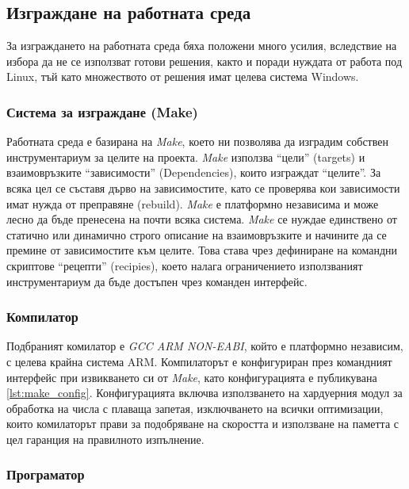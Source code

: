 \subsection{Изграждане на работната среда}

За изграждането на работната среда бяха положени много усилия, вследствие на избора да не се използват готови решения,
както и поради нуждата от работа под Linux, тъй като множеството от решения имат целева система Windows.

\subsubsection{Система за изграждане (Make)}

Работната среда е базирана на \textit{Make}, което ни позволява да изградим собствен инструментариум за целите на проекта.
\textit{Make} използва \enquote{цели} (targets) и взаимовръзките \enquote{зависимости} (Dependencies), които изграждат \enquote{целите}. 
За всяка цел се съставя дърво
на зависимостите, като се проверява
кои зависимости имат нужда от преправяне (rebuild). \textit{Make} е платформно независима и може лесно да бъде пренесена на почти всяка система.
\textit{Make} се нуждае единствено от статично или динамично строго описание на взаимовръзките и начините да се
премине от зависимостите към целите. Това става чрез дефиниране на командни скриптове \enquote{рецепти} (recipies), 
което налага ограничението използваният инструментариум да бъде достъпен чрез команден интерфейс.

\subsubsection{Компилатор}

Подбраният комилатор е \textit{GCC ARM NON-EABI}, който е платформно независим, с целева крайна система ARM.
Компилаторът е конфигуриран през командният интерфейс при извикването си от \textit{Make},
като конфигурацията е публикувана \autoref{lst:make_config}.
Конфигурацията включва използването на хардуерния модул за обработка на числа с плаваща запетая,
изключването на всички оптимизации, които комилаторът прави за подобряване на скоростта и използване на паметта с цел гаранция на правилното изпълнение.

\subsubsection{Програматор}

